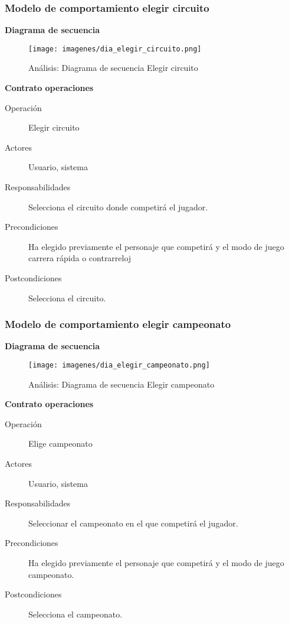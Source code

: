 \subsubsection{Modelo de comportamiento elegir circuito}

\textbf{Diagrama de secuencia}
\begin{figure}[H]
  \label{dia_elegir_circuito}
  \begin{center}
    \texttt{[image: imagenes/dia\_elegir\_circuito.png]}
  \end{center}
  \caption{Análisis: Diagrama de secuencia Elegir circuito }
\end{figure}

\textbf{Contrato operaciones}

\begin{description}
    \item[Operación] Elegir circuito
    \item[Actores] Usuario, sistema
    \item[Responsabilidades] Selecciona el circuito donde competirá el jugador.
    \item[Precondiciones] Ha elegido previamente el personaje que competirá y el modo de juego carrera rápida o contrarreloj
    \item[Postcondiciones] Selecciona el circuito.
\end{description}

\subsubsection{Modelo de comportamiento elegir campeonato}

\textbf{Diagrama de secuencia}
\begin{figure}[H]
  \label{dia_elegir_campeonato}
  \begin{center}
    \texttt{[image: imagenes/dia\_elegir\_campeonato.png]}
  \end{center}
  \caption{Análisis: Diagrama de secuencia Elegir campeonato}
\end{figure}

\textbf{Contrato operaciones}

\begin{description}
    \item[Operación] Elige campeonato
    \item[Actores] Usuario, sistema
    \item[Responsabilidades] Seleccionar el campeonato en el que competirá el jugador.
    \item[Precondiciones] Ha elegido previamente el personaje que competirá y el modo de juego campeonato.
    \item[Postcondiciones] Selecciona el campeonato.
\end{description}

